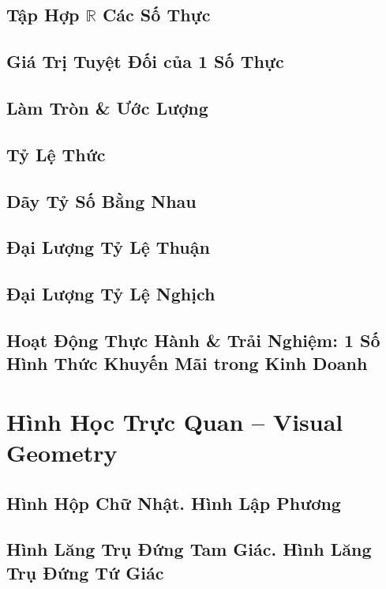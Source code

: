 \documentclass[oneside]{book}
\numberwithin{equation}{section}
\begin{document}
\section{Tập Hợp $\mathbb{R}$ Các Số Thực}

\section{Giá Trị Tuyệt Đối của 1 Số Thực}

\section{Làm Tròn \& Ước Lượng}

\section{Tỷ Lệ Thức}

\section{Dãy Tỷ Số Bằng Nhau}

\section{Đại Lượng Tỷ Lệ Thuận}

\section{Đại Lượng Tỷ Lệ Nghịch}

\section{Hoạt Động Thực Hành \& Trải Nghiệm: 1 Số Hình Thức Khuyến Mãi trong Kinh Doanh}


\chapter{Hình Học Trực Quan -- Visual Geometry}

\section{Hình Hộp Chữ Nhật. Hình Lập Phương}

\section{Hình Lăng Trụ Đứng Tam Giác. Hình Lăng Trụ Đứng Tứ Giác}
\end{document}
